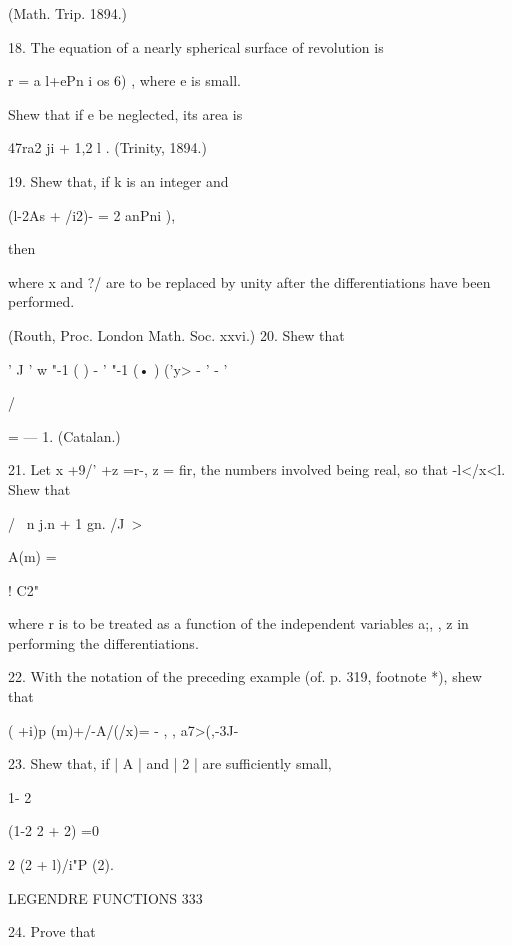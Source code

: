 {{{{(Math. Trip. 1894.) 

18. The equation of a nearly spherical surface of revolution is 

r = a  l+ePn i os 6) , 
where e is small. 

Shew that if e  be neglected, its area is 

47ra2 ji + 1,2    l . (Trinity, 1894.) 

19. Shew that, if k is an integer and 



(l-2As + /i2)- = 2 anPni ), 



then 



where x and ?/ are to be replaced by unity after the differentiations have been performed. 

(Routh, Proc. London Math. Soc. xxvi.) 
20. Shew that 



' J   '   w  "-1 ( ) - ' "-1 (• )    ('y>  - '  - ' 



/ 



= — 1. (Catalan.) 



21. Let x +9/' +z =r-, z = fir, the numbers involved being real, so that -l</x<l. 
Shew that 

/  \ n j.n + 1 gn. /J~> 



A(m) = 



  ! C2" 



where r is to be treated as a function of the independent variables a;,  , z in performing 
the differentiations. 

22. With the notation of the preceding example (of. p. 319, footnote *), shew that 

( +i)p (m)+/-A/(/x)= - , , a7>(,-3J- 

23. Shew that, if | A | and | 2 | are sufficiently small, 

1- 2 



(1-2 2 +  2)   =0 



2 (2  + l)/i"P (2). 



LEGENDRE FUNCTIONS 333 

24. Prove that 

}}}}
